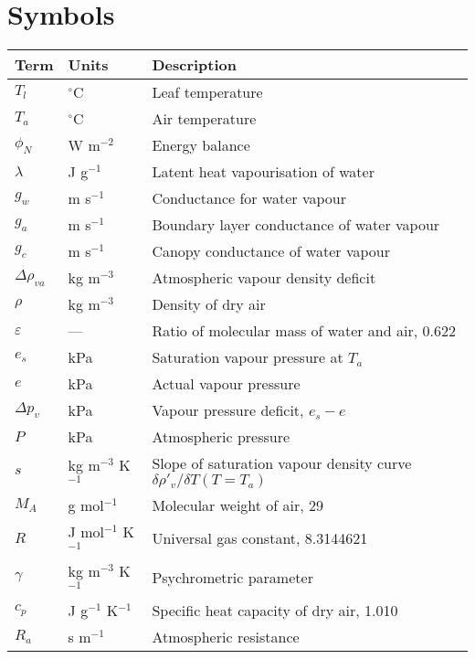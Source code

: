 \documentclass[a4paper]{article}
\begin{document}
\section{Symbols}
\begin{tabularx}{\textwidth}{l | l | X}
Term & Units & Description \\
\hline
$T_l$ & $^{\circ}$C & Leaf temperature \\
$T_a$ & $^{\circ}$C & Air temperature \\
$\phi_N$ & W m$^{-2}$ & Energy balance \\
$\lambda$ & J g$^{-1}$ & Latent heat vapourisation of water \\
$g_w$ & m s$^{-1}$ & Conductance for water vapour \\
$g_a$ & m s$^{-1}$ & Boundary layer conductance of water vapour \\
$g_c$ & m s$^{-1}$ & Canopy conductance of water vapour \\
$\Delta \rho_{va}$ & kg m$^{-3}$ & Atmospheric vapour density deficit \\
$\rho$ & kg m$^{-3}$ & Density of dry air \\
$\varepsilon$ & --- & Ratio of molecular mass of water and air, 0.622 \\
$e_s$ & kPa & Saturation vapour pressure at $T_a$\\
$e$ & kPa & Actual vapour pressure \\
$\Delta p_v$ & kPa & Vapour pressure deficit, $e_s - e$ \\
$P$ & kPa & Atmospheric pressure \\
$s$ & kg m$^{-3}$ K$^{-1}$ & Slope of saturation vapour density curve $\delta \rho'_v / \delta T (T 
= T_a)$ \\
$M_A$ & g mol$^{-1}$ & Molecular weight of air, 29 \\
$R$ & J mol$^{-1}$ K$^{-1}$ & Universal gas constant, 8.3144621 \\
$\gamma$ & kg m$^{-3}$ K$^{-1}$ & Psychrometric parameter \\
$c_p$ & J g$^{-1}$ K$^{-1}$ & Specific heat capacity of dry air, 1.010 \\
$R_a$ & s m$^{-1}$ & Atmospheric resistance \\
\end{tabularx}
\end{document}
